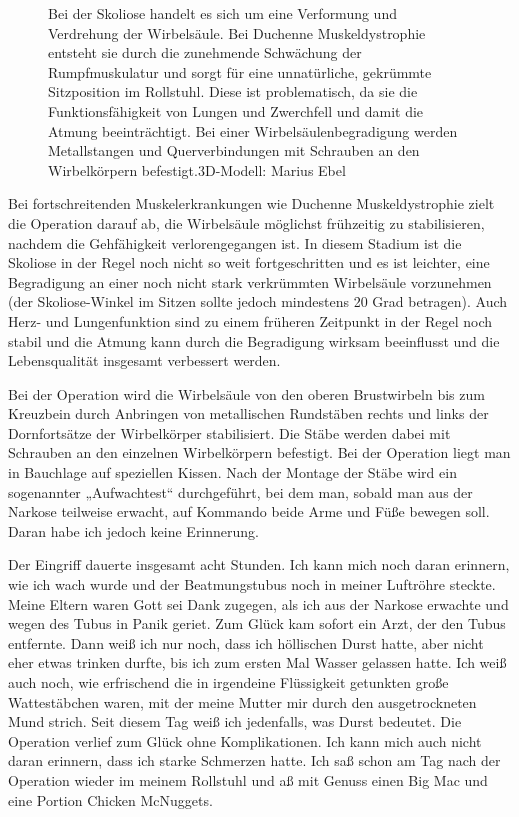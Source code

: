 \documentclass[fontsize=14pt,a4paper,headinclude,DIV=calc,automark]{scrbook}
\begin{document}
\setlength{\fboxsep}{0pt}    %
\setlength{\fboxrule}{0.2pt} %
\begin{figure}[H]
    \centering
    \caption{Bei der Skoliose handelt es sich um eine Verformung und Verdrehung der Wirbelsäule. Bei Duchenne Muskeldystrophie entsteht sie durch die zunehmende Schwächung der Rumpfmuskulatur und sorgt für eine unnatürliche, gekrümmte Sitzposition im Rollstuhl. Diese ist problematisch, da sie die Funktionsfähigkeit von Lungen und Zwerchfell und damit die Atmung beeinträchtigt. Bei einer Wirbelsäulenbegradigung werden Metallstangen und Querverbindungen mit Schrauben an den Wirbelkörpern befestigt.\hfill 3D-Modell: Marius Ebel}
    \label{fig:wirbelsäulenbegradigung}
\end{figure}

Bei fortschreitenden Muskelerkrankungen wie Duchenne Muskeldystrophie zielt die Operation darauf ab, die Wirbelsäule möglichst frühzeitig zu stabilisieren, nachdem die Gehfähigkeit verlorengegangen ist. In diesem Stadium ist die Skoliose in der Regel noch nicht so weit fortgeschritten und es ist leichter, eine Begradigung an einer noch nicht stark verkrümmten Wirbelsäule vorzunehmen (der Skoliose-Winkel im Sitzen sollte jedoch mindestens 20 Grad betragen). Auch Herz- und Lungenfunktion sind zu einem früheren Zeitpunkt in der Regel noch stabil und die Atmung kann durch die Begradigung wirksam beeinflusst und die Lebensqualität insgesamt verbessert werden.

Bei der Operation wird die Wirbelsäule von den oberen Brustwirbeln bis zum Kreuzbein durch Anbringen von metallischen Rundstäben rechts und links der Dornfortsätze der Wirbelkörper stabilisiert. Die Stäbe werden dabei mit Schrauben an den einzelnen Wirbelkörpern befestigt. Bei der Operation liegt man in Bauchlage auf speziellen Kissen. Nach der Montage der Stäbe wird ein sogenannter „Aufwachtest“ durchgeführt, bei dem man, sobald man aus der Narkose teilweise erwacht, auf Kommando beide Arme und Füße bewegen soll. Daran habe ich jedoch keine Erinnerung.

Der Eingriff dauerte insgesamt acht Stunden. Ich kann mich noch daran erinnern, wie ich wach wurde und der Beatmungstubus noch in meiner Luftröhre steckte. Meine Eltern waren Gott sei Dank zugegen, als ich aus der Narkose erwachte und wegen des Tubus in Panik geriet. Zum Glück kam sofort ein Arzt, der den Tubus entfernte. Dann weiß ich nur noch, dass ich höllischen Durst hatte, aber nicht eher etwas trinken durfte, bis ich zum ersten Mal Wasser gelassen hatte. Ich weiß auch noch, wie erfrischend die in irgendeine Flüssigkeit getunkten große Wattestäbchen waren, mit der meine Mutter mir durch den ausgetrockneten Mund strich. Seit diesem Tag weiß ich jedenfalls, was Durst bedeutet.
Die Operation verlief zum Glück ohne Komplikationen. Ich kann mich auch nicht daran erinnern, dass ich starke Schmerzen hatte. Ich saß schon am Tag nach der Operation wieder im meinem Rollstuhl und aß mit Genuss einen Big Mac und eine Portion Chicken McNuggets.
\end{document}
